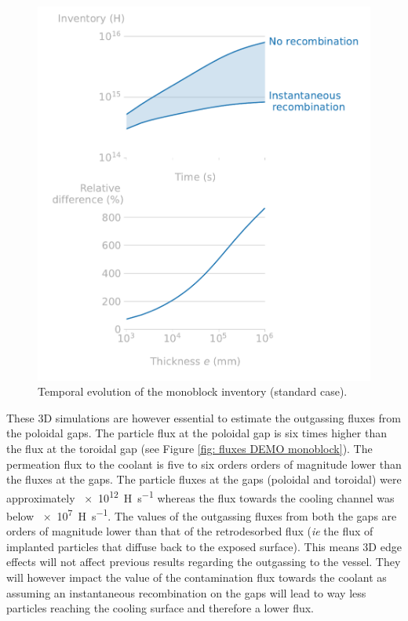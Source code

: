 \begin{figure} [h]
    \centering
    \includegraphics[width=\linewidth]{Figures/Chapter3/monoblocks/3D_monoblocks/inventory_standard_case_w_wo_recomb.pdf}
    \caption{Temporal evolution of the monoblock inventory (standard case).}
    \label{fig: inventory vs time DEMO monoblock}
\end{figure}

These 3D simulations are however essential to estimate the outgassing fluxes from the poloidal gaps.
The particle flux at the poloidal gap is six times higher than the flux at the toroidal gap  (see Figure \ref{fig: fluxes DEMO monoblock}).
The permeation flux to the coolant is five to six orders orders of magnitude lower than the fluxes at the gaps.
The particle fluxes at the gaps (poloidal and toroidal) were approximately \SI{e12}{H.s^{-1}} whereas the flux towards the cooling channel was below \SI{e7}{H.s^{-1}}.
The values of the outgassing fluxes from both the gaps are orders of magnitude lower than that of the retrodesorbed flux (\textit{ie} the flux of implanted particles that diffuse back to the exposed surface).
This means 3D edge effects will not affect previous results regarding the outgassing to the vessel.
They will however impact the value of the contamination flux towards the coolant as assuming an instantaneous recombination on the gaps will lead to way less particles reaching the cooling surface and therefore a lower flux.

